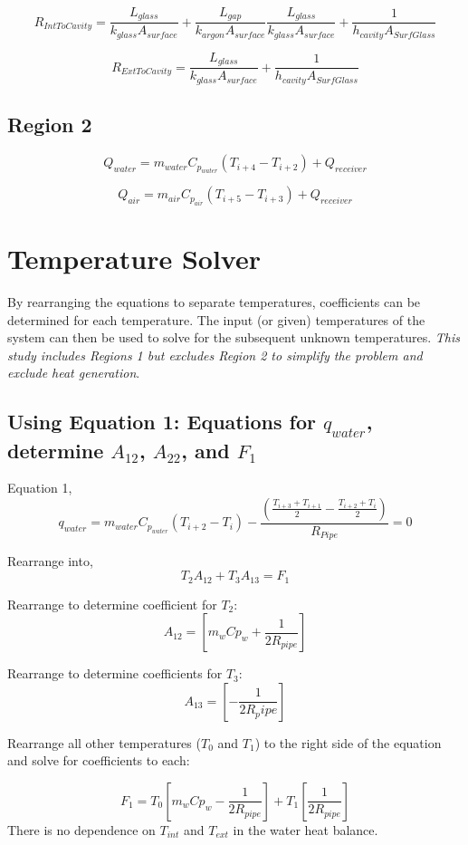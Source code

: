 \documentclass[12pt]{report}
\begin{document}
$$ R_{IntToCavity} = \frac{L_{glass}}{k_{glass}  A_{surface}} 
	+ \frac{L_{gap}}{k_{argon}  A_{surface}} 
	\frac{L_{glass}}{k_{glass}  A_{surface}} + \frac{1}{h_{cavity} A_{SurfGlass}}$$
	
$$ R_{ExtToCavity} = \frac{L_{glass}}{k_{glass}  A_{surface}} + \frac{1}{h_{cavity} A_{SurfGlass}}$$

\subsection{Region 2}

$$ Q_{water} = m_{water} C_{p_{water}} (T_{i+4} - T_{i+2}) + Q_{receiver} $$

$$ Q_{air} = m_{air} C_{p_{air}} (T_{i+5} - T_{i+3}) + Q_{receiver} $$
        
\section{Temperature Solver}
By rearranging the equations to separate temperatures, coefficients can be determined for each temperature. The input (or given) temperatures of the system can then be used to solve for the subsequent unknown temperatures. \textit{This study includes Regions 1 but excludes Region 2 to simplify the problem and exclude heat generation}.

\subsection{Using Equation 1: Equations for $q_{water}$, determine $A_{12}$, $A_{22}$, and $F_1$}

Equation 1, 
$$q_{water} = m_{water} C_{p_{water}} (T_{i+2}-T_i) - 
	\frac
	{\left( 
		\frac{T_{i+3}+T_{i+1}}{2} - \frac{T_{i+2}+T_{i}}{2} 
		\right)}
	{R_{Pipe}}
	= 0 $$

Rearrange into,
$$ T_2 A_{12} + T_3 A_{13} = F_1 $$

Rearrange to determine coefficient for $T_2$:
$$ A_{12} = [m_w Cp_w + \frac{1}{2 R_{pipe}}] $$

Rearrange to determine coefficients for $T_3$:
$$ A_{13} = [- \frac{1}{2 R_pipe}] $$

Rearrange all other temperatures ($T_0$ and $T_1$) to the right side of the equation and solve for coefficients to each:

$$ F_1 = 
	T_0 [m_w Cp_w - \frac{1}{2 R_{pipe}}]
	+ T_1 [\frac{1}{2 R_{pipe}}]$$
There is no dependence on $T_{int}$ and $T_{ext}$ in the water heat balance.
\end{document}
